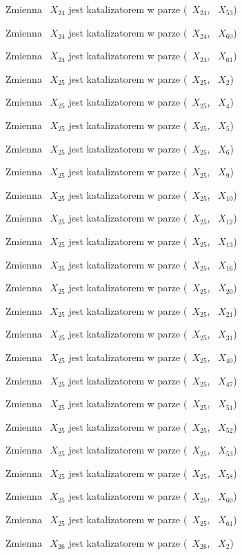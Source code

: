 \documentclass{article}
\begin{document}
Zmienna ~$X_{24}$ jest katalizatorem w parze (~$X_{24}$, ~$X_{53}$)

Zmienna ~$X_{24}$ jest katalizatorem w parze (~$X_{24}$, ~$X_{60}$)

Zmienna ~$X_{24}$ jest katalizatorem w parze (~$X_{24}$, ~$X_{61}$)

Zmienna ~$X_{25}$ jest katalizatorem w parze (~$X_{25}$, ~$X_{2}$)

Zmienna ~$X_{25}$ jest katalizatorem w parze (~$X_{25}$, ~$X_{4}$)

Zmienna ~$X_{25}$ jest katalizatorem w parze (~$X_{25}$, ~$X_{5}$)

Zmienna ~$X_{25}$ jest katalizatorem w parze (~$X_{25}$, ~$X_{6}$)

Zmienna ~$X_{25}$ jest katalizatorem w parze (~$X_{25}$, ~$X_{9}$)

Zmienna ~$X_{25}$ jest katalizatorem w parze (~$X_{25}$, ~$X_{10}$)

Zmienna ~$X_{25}$ jest katalizatorem w parze (~$X_{25}$, ~$X_{12}$)

Zmienna ~$X_{25}$ jest katalizatorem w parze (~$X_{25}$, ~$X_{13}$)

Zmienna ~$X_{25}$ jest katalizatorem w parze (~$X_{25}$, ~$X_{16}$)

Zmienna ~$X_{25}$ jest katalizatorem w parze (~$X_{25}$, ~$X_{20}$)

Zmienna ~$X_{25}$ jest katalizatorem w parze (~$X_{25}$, ~$X_{21}$)

Zmienna ~$X_{25}$ jest katalizatorem w parze (~$X_{25}$, ~$X_{31}$)

Zmienna ~$X_{25}$ jest katalizatorem w parze (~$X_{25}$, ~$X_{40}$)

Zmienna ~$X_{25}$ jest katalizatorem w parze (~$X_{25}$, ~$X_{47}$)

Zmienna ~$X_{25}$ jest katalizatorem w parze (~$X_{25}$, ~$X_{51}$)

Zmienna ~$X_{25}$ jest katalizatorem w parze (~$X_{25}$, ~$X_{52}$)

Zmienna ~$X_{25}$ jest katalizatorem w parze (~$X_{25}$, ~$X_{53}$)

Zmienna ~$X_{25}$ jest katalizatorem w parze (~$X_{25}$, ~$X_{58}$)

Zmienna ~$X_{25}$ jest katalizatorem w parze (~$X_{25}$, ~$X_{60}$)

Zmienna ~$X_{25}$ jest katalizatorem w parze (~$X_{25}$, ~$X_{61}$)

Zmienna ~$X_{26}$ jest katalizatorem w parze (~$X_{26}$, ~$X_{2}$)
\end{document}
